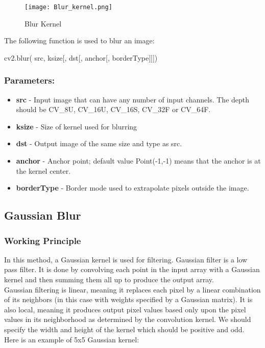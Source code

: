 \documentclass[]{article}
\newenvironment{Shaded}{}{}
\newcommand{\NormalTok}[1]{{#1}}
\providecommand{\tightlist}{%
  \setlength{\itemsep}{0pt}\setlength{\parskip}{0pt}}
\begin{document}
\begin{figure}[htbp]
\centering
\texttt{[image: Blur\_kernel.png]}
\caption{Blur Kernel}
\end{figure}

The following function is used to blur an image:

\begin{Shaded}
\begin{Highlighting}[]
\NormalTok{cv2.blur( src, ksize[, dst[, anchor[, borderType]]])}
\end{Highlighting}
\end{Shaded}

\subsubsection{Parameters:}\label{parameters}

\begin{itemize}
\tightlist
\item
  \textbf{src} - Input image that can have any number of input channels.
  The depth should be CV\_8U, CV\_16U, CV\_16S, CV\_32F or CV\_64F.\\
\item
  \textbf{ksize} - Size of kernel used for blurring\\
\item
  \textbf{dst} - Output image of the same size and type as src.\\
\item
  \textbf{anchor} - Anchor point; default value Point(-1,-1) means that
  the anchor is at the kernel center.
\item
  \textbf{borderType} - Border mode used to extrapolate pixels outside
  the image.
\end{itemize}

\subsection{Gaussian Blur}\label{gaussian-blur}

\subsubsection{Working Principle}\label{working-principle-1}

In this method, a Gaussian kernel is used for filtering. Gaussian filter
is a low pass filter. It is done by convolving each point in the input
array with a Gaussian kernel and then summing them all up to produce the
output array.\\
Gaussian filtering is linear, meaning it replaces each pixel by a linear
combination of its neighbors (in this case with weights specified by a
Gaussian matrix). It is also local, meaning it produces output pixel
values based only upon the pixel values in its neighborhood as
determined by the convolution kernel. We should specify the width and
height of the kernel which should be positive and odd.\\
Here is an example of 5x5 Gaussian kernel:
\end{document}
